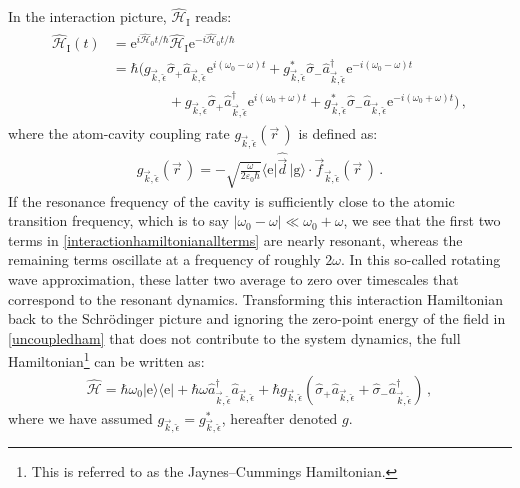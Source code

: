 \documentclass[../Thesis-IJspeert.tex]{subfiles}
\begin{document}
\fi

In the interaction picture, $\hat{\mathcal{H}}_\mathrm{I}$ reads:
\begin{align}
\label{interactionhamiltonianallterms}
\begin{split}
\hat{\mathcal{H}}_\mathrm{I}(t) &= \mathrm{e}^{i\hat{\mathcal{H}}_0 t/\hbar}\hat{\mathcal{H}}_\mathrm{I} \mathrm{e}^{-i \hat{\mathcal{H}}_0 t/\hbar} \\&= \hbar \Big( g_{\vec{k},\hat{\epsilon}} \hat{\sigma}_+ \hat{a}_{\vec{k},\hat{\epsilon}} \mathrm{e}^{i(\omega_0-\omega)t} + g^*_{\vec{k},\hat{\epsilon}} \hat{\sigma}_- \hat{a}^\dagger_{\vec{k},\hat{\epsilon}} \mathrm{e}^{-i(\omega_0-\omega)t} \\ &\hspace{4em}+ g_{\vec{k},\hat{\epsilon}} \hat{\sigma}_+ \hat{a}^\dagger_{\vec{k},\hat{\epsilon}} \mathrm{e}^{i(\omega_0+\omega)t} + g^*_{\vec{k},\hat{\epsilon}} \hat{\sigma}_- \hat{a}_{\vec{k},\hat{\epsilon}} \mathrm{e}^{-i(\omega_0+\omega)t}     \Big)\,,
\end{split}
\end{align}
where the atom-cavity coupling rate $g_{\vec{k},\hat{\epsilon}}(\vec{r}\,)$ is defined as:
\begin{align}
\label{couplingrate}
g_{\vec{k},\hat{\epsilon}}(\vec{r}\,) = -\sqrt{\frac{\omega}{2\varepsilon_0\hbar}} \langle \mathrm{e} \vert \hat{\vec{d}} \, \vert \mathrm{g} \rangle \cdot \vec{f}_{\vec{k},\hat{\epsilon}}(\vec{r}\,)\,.
\end{align}
If the resonance frequency of the cavity is sufficiently close to the atomic transition frequency, which is to say $\vert \omega_0-\omega\vert \ll \omega_0 + \omega$, we see that the first two terms in \autoref{interactionhamiltonianallterms} are nearly resonant, whereas the remaining terms oscillate at a frequency of roughly $2\omega$. In this so-called rotating wave approximation, these latter two average to zero over timescales that correspond to the resonant dynamics. Transforming this interaction Hamiltonian back to the Schr\"{o}dinger picture and ignoring the zero-point energy of the field in \autoref{uncoupledham} that does not contribute to the system dynamics, the full Hamiltonian\footnote{This is referred to as the Jaynes--Cummings Hamiltonian.} can be written as:
\begin{align}
\label{JC}
\hat{\mathcal{H}}=\hbar\omega_0 \vert \mathrm{e} \rangle \langle \mathrm{e} \vert + \hbar \omega \hat{a}^\dagger_{\vec{k},\hat{\epsilon}} \hat{a}_{\vec{k},\hat{\epsilon}} + \hbar g_{\vec{k},\hat{\epsilon}}(\hat{\sigma}_+\hat{a}_{\vec{k},\hat{\epsilon}} + \hat{\sigma}_-\hat{a}^\dagger_{\vec{k},\hat{\epsilon}})\,,
\end{align}
where we have assumed $g_{\vec{k},\hat{\epsilon}}=g^*_{\vec{k},\hat{\epsilon}}$, hereafter denoted $g$.
\end{document}
